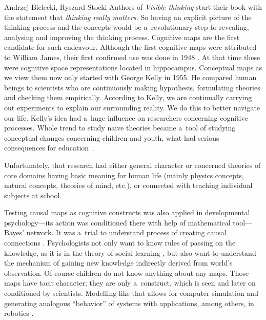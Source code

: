 \begin{artengenv2auth}{Andrzej Bielecki, Ryszard Stocki}
Authors of \textit{Visible thinking} 
\parencite[][]{brysson_visible_2004} %
 start their book with the statement that \textit{thinking really matters.} So having an explicit picture of the thinking process and the concepts would be a~revolutionary step to revealing, analysing and improving the thinking process. Cognitive maps are the first candidate for such endeavour. Although the first cognitive maps were attributed to William James, their first confirmed use was done in 1948 
\parencite[][]{tolman_cognitive_1948}. %
 At that time these were cognitive space representations located in hippocampus. Conceptual maps as we view them now only started with George Kelly in 1955. He compared human beings to scientists who are continuously making hypothesis, formulating theories and checking them empirically. According to Kelly, we are continually carrying out experiments to explain our surrounding reality. We do this to better navigate our life. Kelly's idea had a~huge influence on researchers concerning cognitive processes. Whole trend to study naive theories became a~tool of studying conceptual changes concerning children and youth, what had serious consequences for education 
\parencites[][]{kuhn_children_1989}[][]{vosniadou_towards_1996}.%




Unfortunately, that research had either general character 
\parencite[e.g.,][]{kruglansky_lay_1980} %
 or concerned theories of core domains having basic meaning for human life (mainly physics concepts, natural concepts, theories of mind, etc.), or connected with teaching individual subjects at school.



Testing causal maps as cognitive constructs was also applied in developmental psychology---its action was conditioned there with help of mathematical tool---Bayes' network. It was a~trial to understand process of creating causal connections 
\parencite[][]{gopnik_theory_2004}. %
 Psychologists not only want to know rules of passing on the knowledge, as it is in the theory of social learning 
\parencite[][]{bandura_social_1977}, %
 but also want to understand the mechanism of gaining new knowledge indirectly derived from world's observation. Of course children do not know anything about any maps. Those maps have tacit character; they are only a~construct, which is seen and later on conditioned by scientists. Modelling like that allows for computer simulation and generating analogous ``behavior'' of systems with applications, among others, in robotics 
\parencite[][]{chaib-draa_causal_2002}.%





\end{artengenv2auth}
